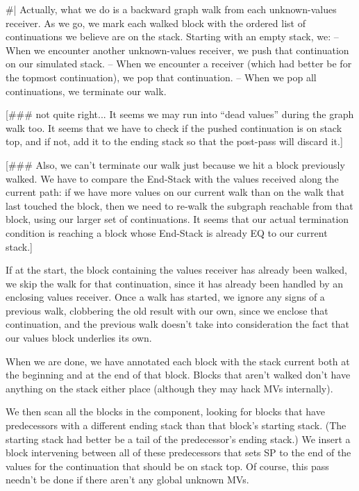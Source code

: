 \#|
Actually, what we do is a backward graph walk from each unknown-values
receiver.   As we go, we mark each walked block with the ordered list of
continuations we believe are on the stack.  Starting with an empty stack, we:
 -- When we encounter another unknown-values receiver, we push that
    continuation on our simulated stack.
 -- When we encounter a receiver (which had better be for the topmost
    continuation), we pop that continuation.
 -- When we pop all continuations, we terminate our walk.

[\#\#\# not quite right...  It seems we may run into ``dead values'' during the
graph walk too.  It seems that we have to check if the pushed continuation is
on stack top, and if not, add it to the ending stack so that the post-pass will
discard it.]



[\#\#\# Also, we can't terminate our walk just because we hit a block previously
walked.  We have to compare the End-Stack with the values received along
the current path: if we have more values on our current walk than on the walk
that last touched the block, then we need to re-walk the subgraph reachable
from that block, using our larger set of continuations.  It seems that our
actual termination condition is reaching a block whose End-Stack is already EQ
to our current stack.]





If at the start, the block containing the values receiver has already been
walked, we skip the walk for that continuation, since it has already been
handled by an enclosing values receiver.  Once a walk has started, we
ignore any signs of a previous walk, clobbering the old result with our own,
since we enclose that continuation, and the previous walk doesn't take into
consideration the fact that our values block underlies its own.

When we are done, we have annotated each block with the stack current both at
the beginning and at the end of that block.  Blocks that aren't walked don't
have anything on the stack either place (although they may hack MVs
internally).  

We then scan all the blocks in the component, looking for blocks that have
predecessors with a different ending stack than that block's starting stack.
(The starting stack had better be a tail of the predecessor's ending stack.)
We insert a block intervening between all of these predecessors that sets SP to
the end of the values for the continuation that should be on stack top.  Of
course, this pass needn't be done if there aren't any global unknown MVs.

